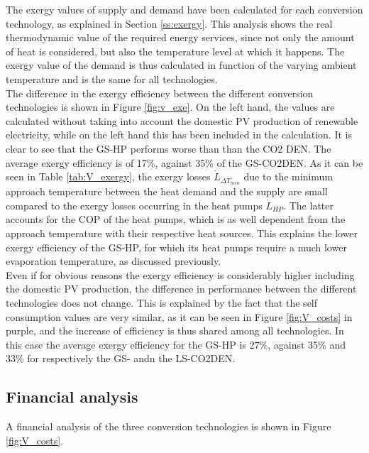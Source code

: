 \documentclass{article}
\begin{document}
The exergy values of supply and demand have been calculated for each conversion technology, as explained in Section \ref{ss:exergy}. This analysis shows the real thermodynamic value of the required energy services, since not only the amount of heat is considered, but also the temperature level at which it happens. The exergy value of the demand is thus calculated in function of the varying ambient temperature and is the same for all technologies.\\

The difference in the exergy efficiency between the different conversion technologies is shown in Figure \ref{fig:v_exe}. On the left hand, the values are calculated without taking into account the domestic PV production of renewable electricity, while on the left hand this has been included in the calculation. It is clear to see that the GS-HP performs worse than than the CO2 DEN. The average exergy efficiency is of 17\%, against 35\% of the GS-CO2DEN. As it can be seen in Table \ref{tab:V_exergy}, the exergy losses $\dot{L}_{\Delta T_{min}}$ due to the minimum approach temperature between the heat demand and the supply are small compared to the exergy losses occurring in the heat pumps $\dot{L}_{HP}$. The latter accounts for the COP of the heat pumps, which is as well dependent from the approach temperature with their respective heat sources. This explains the lower exergy efficiency of the GS-HP, for which its heat pumps require a much lower evaporation temperature, as discussed previously.\\

Even if for obvious reasons the exergy efficiency is considerably higher including the domestic PV production, the difference in performance between the different technologies does not change. This is explained by the fact that the self consumption values are very similar, as it can be seen in Figure \ref{fig:V_costs} in purple, and the increase of efficiency is thus shared among all technologies. In this case the average exergy efficiency for the GS-HP is 27\%, against 35\% and 33\% for respectively the GS- andn the LS-CO2DEN.



\subsection{Financial analysis}

A financial analysis of the three conversion technologies is shown in Figure \ref{fig:V_costs}. 
\end{document}
